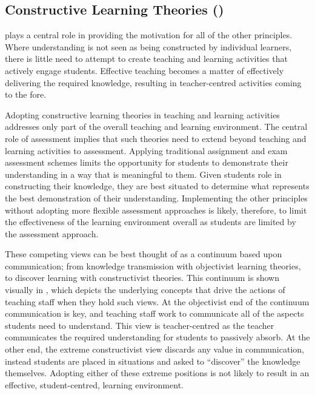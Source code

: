 \subsection{Constructive Learning Theories ()} %
\label{sub:constructive_learning_theories}

 plays a central role in providing the motivation for all of the other principles. Where understanding is not seen as being constructed by individual learners, there is little need to attempt to create teaching and learning activities that actively engage students. Effective teaching becomes a matter of effectively delivering the required knowledge, resulting in teacher-centred activities coming to the fore. 

Adopting constructive learning theories in teaching and learning activities addresses only part of the overall teaching and learning environment. The central role of assessment implies that such theories need to extend beyond teaching and learning activities to assessment. Applying traditional assignment and exam assessment schemes limits the opportunity for students to demonstrate their understanding in a way that is meaningful to them. Given students role in constructing their knowledge, they are best situated to determine what represents the best demonstration of their understanding. Implementing the other principles without adopting more flexible assessment approaches is likely, therefore, to limit the effectiveness of the learning environment overall as students are limited by the assessment approach.

These competing views can be best thought of as a continuum based upon communication; from knowledge transmission with objectivist learning theories, to discover learning with constructivist theories. This continuum is shown visually in , which depicts the underlying concepts that drive the actions of teaching staff when they hold such views. At the objectivist end of the continuum communication is key, and teaching staff work to communicate all of the aspects students need to understand. This view is teacher-centred as the teacher communicates the required understanding for students to passively absorb. At the other end, the extreme constructivist view discards any value in communication, instead students are placed in situations and asked to ``discover'' the knowledge themselves. Adopting either of these extreme positions is not likely to result in an effective, student-centred, learning environment.

